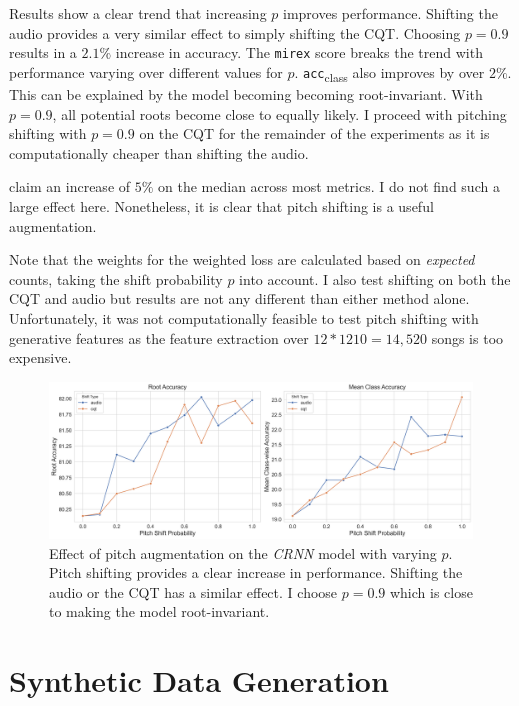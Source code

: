 Results show a clear trend that increasing $p$ improves performance. Shifting the audio provides a very similar effect to simply shifting the CQT. Choosing $p=0.9$ results in a $2.1\%$ increase in accuracy. The \texttt{mirex} score breaks the trend with performance varying over different values for $p$. \texttt{acc}\textsubscript{class} also improves by over $2\%$. This can be explained by the model becoming becoming root-invariant. With $p=0.9$, all potential roots become close to equally likely. I proceed with pitching shifting with $p=0.9$ on the CQT for the remainder of the experiments as it is computationally cheaper than shifting the audio.

\citet{StructuredTraining} claim an increase of $5\%$ on the median across most metrics. I do not find such a large effect here. Nonetheless, it is clear that pitch shifting is a useful augmentation.

Note that the weights for the weighted loss are calculated based on \emph{expected} counts, taking the shift probability $p$ into account. I also test shifting on both the CQT and audio but results are not any different than either method alone. Unfortunately, it was not computationally feasible to test pitch shifting with generative features as the feature extraction over $12 * 1210 = 14,520$ songs is too expensive.

\begin{figure}[H]
    \centering
    \includegraphics[width=1.0\textwidth]{figures/pitch_shift_analysis.png}
    \caption{Effect of pitch augmentation on the \emph{CRNN} model with varying $p$. Pitch shifting provides a clear increase in performance. Shifting the audio or the CQT has a similar effect. I choose $p=0.9$ which is close to making the model root-invariant.}\label{fig:pitch_augmentation}
\end{figure}


\section{Synthetic Data Generation}\label{sec:synthetic_data}

